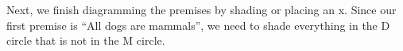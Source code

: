 \documentclass[../logic-text.tex]{subfiles}
\begin{document}



Next, we finish diagramming the premises by shading or placing an x. Since our first premise is \enquote{All dogs are mammals}, we need to shade everything in the D circle that is not in the M circle.
\end{document}
